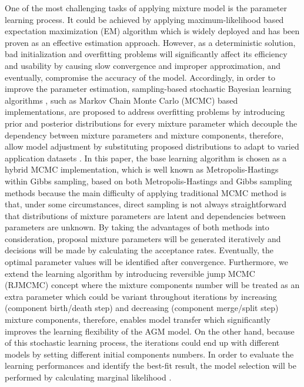 \documentclass[conference]{IEEEtran}
\begin{document}
One of the most challenging tasks of applying mixture model is the parameter learning process. It could be achieved by applying maximum-likelihood based expectation maximization (EM) algorithm \cite{Dempster1977} which is widely deployed and has been proven as an effective estimation approach. However, as a deterministic solution, bad initialization and overfitting problems \cite{Bouguila2009} \cite{Bouguila2012} will significantly affect its efficiency and usability by causing slow convergence and improper approximation, and eventually, compromise the accuracy of the model. Accordingly, in order to improve the parameter estimation, sampling-based stochastic Bayesian learning algorithms \cite{Bourouis2014,Bouguila2008}, such as Markov Chain Monte Carlo (MCMC) based implementations\cite{Fu2018a}, are proposed to address overfitting problems by introducing prior and posterior distributions for every mixture parameter which decouple the dependency between mixture parameters and mixture components, therefore, allow model adjustment by substituting proposed distributions to adapt to varied application datasets \cite{Bouguila2007,Fu2018}. In this paper, the base learning algorithm is chosen as a hybrid MCMC implementation, which is well known as Metropolis-Hastings within Gibbs sampling\cite{Bouguila2009}, based on both Metropolis-Hastings \cite{Hastings1970} and Gibbs sampling \cite{Geman1987} methods because the main difficulty of applying traditional MCMC method is that, under some circumstances, direct sampling is not always straightforward that distributions of mixture parameters are latent and dependencies between parameters are unknown. By taking the advantages of both methods into consideration, proposal mixture parameters will be generated iteratively and decisions will be made by calculating the acceptance rates. Eventually, the optimal parameter values will be identified after convergence. Furthermore, we extend the learning algorithm by introducing reversible jump MCMC (RJMCMC)\cite{Bouguila2012} concept where the mixture components number will be treated as an extra parameter which could be variant throughout iterations by increasing (component birth/death step) and decreasing (component merge/split step) mixture components, therefore, enables model transfer which significantly improves the learning flexibility of the AGM model. On the other hand, because of this stochastic learning process, the iterations could end up with different models by setting different initial components numbers. In order to evaluate the learning performances and identify the best-fit result, the model selection will be performed by calculating marginal likelihood \cite{Bouguila2009}.
\end{document}
